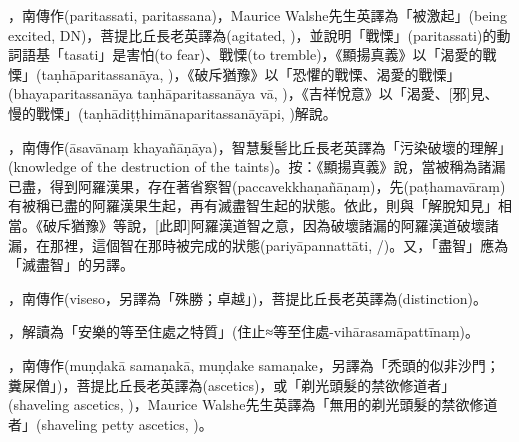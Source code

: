 \startitemgroup[noteitems]
\item{}，南傳作(paritassati, paritassana)，Maurice Walshe先生英譯為「被激起」(being excited, DN)，菩提比丘長老英譯為(agitated, )，並說明「戰慄」(paritassati)的動詞語基「tasati」是害怕(to fear)、戰慄(to tremble)，《顯揚真義》以「渴愛的戰慄」(taṇhāparitassanāya, )，《破斥猶豫》以「恐懼的戰慄、渴愛的戰慄」(bhayaparitassanāya taṇhāparitassanāya vā, )，《吉祥悅意》以「渴愛、[邪]見、慢的戰慄」(taṇhādiṭṭhimānaparitassanāyāpi, )解說。
\stopitemgroup

\startitemgroup[noteitems]
\item{}，南傳作(āsavānaṃ khayañāṇāya)，智慧髮髻比丘長老英譯為「污染破壞的理解」(knowledge of the destruction of the taints)。按：《顯揚真義》說，當被稱為諸漏已盡，得到阿羅漢果，存在著省察智(paccavekkhaṇañāṇaṃ)，先(paṭhamavāraṃ)有被稱已盡的阿羅漢果生起，再有滅盡智生起的狀態。依此，則與「解脫知見」相當。《破斥猶豫》等說，[此即]阿羅漢道智之意，因為破壞諸漏的阿羅漢道破壞諸漏，在那裡，這個智在那時被完成的狀態(pariyāpannattāti, /)。又，「盡智」應為「滅盡智」的另譯。
\stopitemgroup

\startitemgroup[noteitems]
\item{}，南傳作(viseso，另譯為「殊勝；卓越」)，菩提比丘長老英譯為(distinction)。
\item{}，解讀為「安樂的等至住處之特質」(住止≈等至住處-vihārasamāpattīnaṃ)。
\stopitemgroup

\startitemgroup[noteitems]
\item{}，南傳作(muṇḍakā samaṇakā, muṇḍake samaṇake，另譯為「禿頭的似非沙門；糞屎僧」)，菩提比丘長老英譯為(ascetics)，或「剃光頭髮的禁欲修道者」(shaveling ascetics, )，Maurice Walshe先生英譯為「無用的剃光頭髮的禁欲修道者」(shaveling petty ascetics, )。
\stopitemgroup

